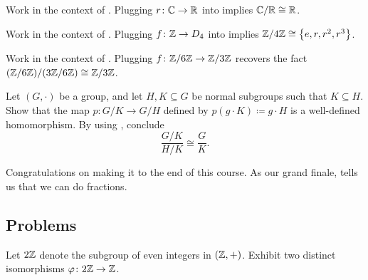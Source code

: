 \documentclass[../main.tex]{subfiles}
\begin{document}
\begin{example}
    Work in the context of . Plugging $r\colon\mathbb C\to\mathbb R$ into  implies $\mathbb C/\mathbb R\cong\mathbb R$.
\end{example}
\begin{example}
    Work in the context of . Plugging $f\colon\mathbb Z\to D_4$ into  implies $\mathbb Z/4\mathbb Z\cong\left\{e,r,r^2,r^3\right\}$.
\end{example}
\begin{example}
    Work in the context of . Plugging $f\colon\mathbb Z/6\mathbb Z\to\mathbb Z/3\mathbb Z$ recovers the fact $(\mathbb Z/6\mathbb Z)/(3\mathbb Z/6\mathbb Z)\cong\mathbb Z/3\mathbb Z$.
\end{example}
\begin{exe} \label{exe:fractions}
    Let $(G,\cdot)$ be a group, and let $H,K\subseteq G$ be normal subgroups such that $K\subseteq H$. Show that the map $p\colon G/K\to G/H$ defined by $p(g\cdot K)\coloneqq g\cdot H$ is a well-defined homomorphism. By using , conclude
    \[\frac{G/K}{H/K}\cong\frac GK.\]
\end{exe}
Congratulations on making it to the end of this course. As our grand finale,  tells us that we can do fractions.

\subsection{Problems}


\begin{homework}
    Let $2\mathbb Z$ denote the subgroup of even integers in $(\mathbb Z,+)$. Exhibit two distinct isomorphisms $\varphi\colon2\mathbb Z\to\mathbb Z$.
\end{homework}
\end{document}

